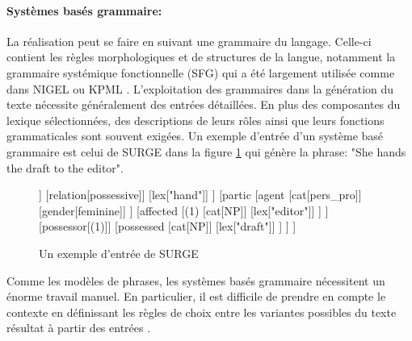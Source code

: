 \paragraph{Systèmes basés grammaire:} La réalisation peut se faire en suivant une grammaire du langage. Celle-ci contient les règles morphologiques et de structures de la langue, notamment la grammaire systémique fonctionnelle (SFG) \citep{Halliday2004} qui a été largement utilisée comme dans NIGEL \citep{Mann1983} ou KPML \citep{Bateman1997}. L'exploitation des grammaires dans la génération du texte nécessite généralement des entrées détaillées. En plus des composantes du lexique sélectionnées, des descriptions de leurs rôles ainsi que leurs fonctions grammaticales sont souvent exigées. Un exemple d'entrée d'un système basé grammaire est celui de SURGE \citep{Elhadad1996} dans la figure \ref{surge} qui génère la phrase: "She hands the draft to the editor".
\begin{figure}[H]
	\begin{center}
		\begin{forest} [
			[cat:clause]
			[process
			[type[composite]]
			[relation[possessive]]
			[lex[\color{red}"hand"]]
			]
			[partic
			[agent
			[cat[pers\_pro]]
			[gender[feminine]]
			]
			[affected
			[(1)
			[cat[NP]]
			[lex[\color{red}"editor"]]
			]
			]
			[possessor[(1)]]
			[possessed
			[cat[NP]]
			[lex[\color{red}"draft"]]
			]
			]
			]
		\end{forest}
	\end{center}
	\caption{Un exemple d'entrée de SURGE \citep{Elhadad1996}}\label{surge}
\end{figure}
Comme les modèles de phrases, les systèmes basés grammaire nécessitent un énorme travail manuel. En particulier, il est difficile de prendre en compte le contexte en définissant les règles de choix entre les variantes possibles du texte résultat à partir des entrées \citep{Gatt2018}.

